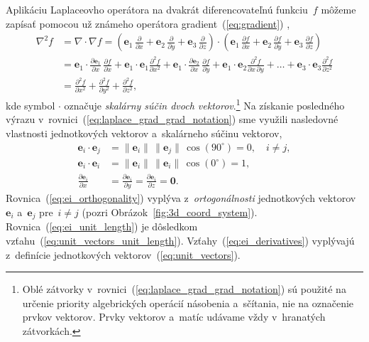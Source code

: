 \documentclass[a4paper, 12pt]{book}
\let\vec\mathbf
\begin{document}
Aplikáciu Laplaceovho operátora na dvakrát diferencovateľnú funkciu~$f$ môžeme 
zapísať pomocou už známeho operátora gradient~(\ref{eq:gradient}) 
\parencite{SansoGeoidDetermination},
%
\begin{equation}
\label{eq:laplace_grad_grad_notation}
\begin{split}
\nabla^2 f &= \nabla \cdot \nabla f = \left( \vec e_1 \, 
\frac{\partial}{\partial x} + \vec e_2 \, \frac{\partial}{\partial y} + \vec 
e_3 \, \frac{\partial}{\partial z} \right) \cdot \left( \vec e_1 \, 
\frac{\partial f}{\partial x} + \vec e_2 \, \frac{\partial f}{\partial y} 
+ \vec e_3 \, \frac{\partial f}{\partial z} \right)\\
%
&= \vec e_1 \cdot \frac{\partial \vec e_1}{\partial x} \, \frac{\partial 
f}{\partial x} + \vec e_1 \cdot \vec e_1 \frac{\partial^2 f}{\partial x^2} 
+ \vec e_1 \cdot \frac{\partial \vec e_2}{\partial x} \, \frac{\partial 
f}{\partial y} + \vec e_1 \cdot \vec e_2 \frac{\partial^2 f}{\partial x \, 
\partial y} + \dots + \vec e_3 \cdot \vec e_3 \frac{\partial^2 f}{\partial 
z^2}\\
%
&=\frac{\partial^2 f}{\partial x^2} + \frac{\partial^2 f}{\partial y^2} 
+ \frac{\partial^2 f}{\partial z^2}{,}
\end{split}
\end{equation}
%
kde symbol $\cdot$ označuje \emph{skalárny súčin dvoch vektorov}.\footnote{Oblé 
zátvorky v~rovnici~(\ref{eq:laplace_grad_grad_notation}) sú použité na určenie 
priority algebrických operácií násobenia a~sčítania, nie na označenie prvkov 
vektorov.  Prvky vektorov a~matíc udávame vždy v~hranatých zátvorkách.} Na 
získanie posledného výrazu v~rovnici~(\ref{eq:laplace_grad_grad_notation}) sme 
využili nasledovné vlastnosti jednotkových vektorov a~skalárneho súčinu 
vektorov,
%
\begin{align}
\label{eq:ei_orthogonality}
\vec e_i \cdot \vec e_j &= \| \vec e_i \| \, \| \vec e_j \| \, \cos(90^\circ) 
= 0{,} \quad i \neq j{,}\\
%
\label{eq:ei_unit_length}
\vec e_i \cdot \vec e_i &= \| \vec e_i \| \, \| \vec e_i \| \, \cos(0^\circ) 
= 1{,}\\
%
\label{eq:ei_derivatives}
\frac{\partial \vec e_i}{\partial x} &= \frac{\partial \vec e_i}{\partial y} 
= \frac{\partial \vec e_i}{\partial z} = \vec 0{.}
\end{align}
%
Rovnica~(\ref{eq:ei_orthogonality}) vyplýva z~\emph{ortogonálnosti} 
jednotkových vektorov~$\vec e_i$ a~$\vec e_j$ pre~$i \neq j$ (pozri 
Obrázok~\ref{fig:3d_coord_system}).  Rovnica~(\ref{eq:ei_unit_length}) je 
dôsledkom vzťahu~(\ref{eq:unit_vectors_unit_length}).  
Vzťahy~(\ref{eq:ei_derivatives}) vyplývajú z~definície jednotkových 
vektorov~(\ref{eq:unit_vectors}).
\end{document}
